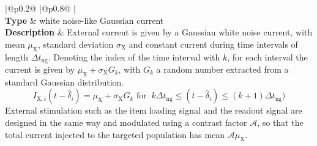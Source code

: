 \documentclass[a4paper, 12pt, twoside, openright]{book}
\newcommand{\ext}{\text{X}}   %
\def\marg{2pt}
\begin{document}
\begin{table}[H]
\begin{tabular}{
  |@{\hspace*{\marg}}p{}@{\hspace*{\marg}}
  |@{\hspace*{\marg}}p{}@{\hspace*{\marg}}
  |}
  \hline 
  \\
\hline 
\textbf{Type} & white noise-like Gaussian current\\
\hline 
  \textbf{Description} & External current is given by a Gaussian white noise current, with mean $\mu_{\ext}$, standard deviation $\sigma_{\ext}$ and constant current during time intervals of length $\Delta t_{\text{ng}}$. Denoting the index of the time interval with $k$, for each interval the current is given by $\mu_{\ext}+\sigma_{\ext}G_k$, with $G_k$ a random number extracted from a standard Gaussian distribution.
  \begin{equation*}
    I_{\ext,i}(t-\hat{\delta}_{i}) = \mu_{\ext}+\sigma_{\ext}G_k \text{  for } \ k\Delta t_{\text{ng}} \leq (t-\hat{\delta}_{i}) \leq (k+1)\Delta t_{\text{ng}})
  \end{equation*}
  External stimulation such as the item loading signal and the readout signal are designed in the same way and modulated using a contrast factor $\mathcal{A}$, so that the total current injected to the targeted population has mean $\mathcal{A}\mu_{\ext}$.
\end{tabular}


\end{table}
\end{document}
